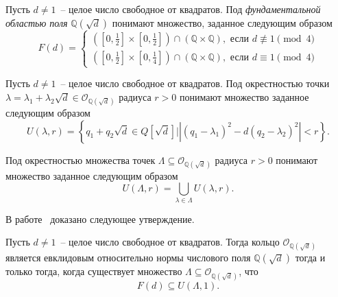 \documentclass[_00_dissertation.tex]{subfiles}
\begin{document}
\begin{definition}
    Пусть $d \neq 1$~-- целое число свободное от квадратов.
    Под \emph{фундаментальной областью поля} $\mathbb{Q}(\sqrt{d})$ понимают множество, заданное следующим образом
    \begin{equation*}
        F(d) = \begin{cases}
            \left(
                \left[0, \frac{1}{2}\right] \times \left[0, \frac{1}{2}\right]
            \right) \cap \left(
                \mathbb{Q} \times \mathbb{Q}
            \right), \textrm{ если } d \not\equiv 1 \pmod 4\\
            \left(
                \left[0, \frac{1}{2}\right] \times \left[0, \frac{1}{4}\right]
            \right) \cap \left(
                \mathbb{Q} \times \mathbb{Q}
            \right), \textrm{ если } d \equiv 1 \pmod 4
        \end{cases}
    \end{equation*}
\end{definition}

\begin{definition}
    Пусть $d \neq 1$~-- целое число свободное от квадратов.
    Под окрестностью точки $\lambda = \lambda_1 + \lambda_2 \sqrt{d} \in \mathcal{O}_{\mathbb{Q}(\sqrt{d})}$ радиуса $r > 0$ понимают множество заданное следующим образом
    \begin{equation*}
        U(\lambda, r) = \left\{
            q_1 + q_2 \sqrt{d} \in Q[\sqrt{d}] \big| |(q_1 - \lambda_1)^2 - d(q_2 - \lambda_2)^2| < r
        \right\}.
    \end{equation*}

    Под окрестностью множества точек $\Lambda \subseteq \mathcal{O}_{\mathbb{Q}(\sqrt{d})}$ радиуса $r > 0$ понимают множество заданное следующим образом
    \begin{equation*}
        U(\Lambda, r) = \bigcup_{\lambda \in \Lambda} U(\lambda, r).
    \end{equation*}
\end{definition}

В работе~\cite[с.~832]{source:Selfridge} доказано следующее утверждение.

\begin{statement}\label{proposition:fundamental_in_circle} \cite[с.~832]{source:Selfridge}
    Пусть $d \neq 1$~-- целое число свободное от квадратов.
    Тогда кольцо $\mathcal{O}_{\mathbb{Q}(\sqrt{d})}$ является евклидовым относительно нормы числового поля $\mathbb{Q}(\sqrt{d})$ тогда и только тогда, когда существует множество $\Lambda \subseteq \mathcal{O}_{\mathbb{Q}(\sqrt{d})}$, что
    \begin{equation*}
        F(d) \subseteq U(\Lambda, 1).
    \end{equation*}
\end{statement}
\end{document}
